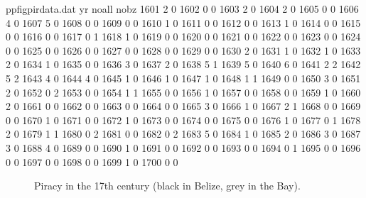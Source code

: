 \begin{filecontents}{ppfigpirdata.dat}
yr	noall	nobz
1601	2	0
1602	0	0
1603	2	0
1604	2	0
1605	0	0
1606	4	0
1607	5	0
1608	0	0
1609	0	0
1610	1	0
1611	0	0
1612	0	0
1613	1	0
1614	0	0
1615	0	0
1616	0	0
1617	0	1
1618	1	0
1619	0	0
1620	0	0
1621	0	0
1622	0	0
1623	0	0
1624	0	0
1625	0	0
1626	0	0
1627	0	0
1628	0	0
1629	0	0
1630	2	0
1631	1	0
1632	1	0
1633	2	0
1634	1	0
1635	0	0
1636	3	0
1637	2	0
1638	5	1
1639	5	0
1640	6	0
1641	2	2
1642	5	2
1643	4	0
1644	4	0
1645	1	0
1646	1	0
1647	1	0
1648	1	1
1649	0	0
1650	3	0
1651	2	0
1652	0	2
1653	0	0
1654	1	1
1655	0	0
1656	1	0
1657	0	0
1658	0	0
1659	1	0
1660	2	0
1661	0	0
1662	0	0
1663	0	0
1664	0	0
1665	3	0
1666	1	0
1667	2	1
1668	0	0
1669	0	0
1670	1	0
1671	0	0
1672	1	0
1673	0	0
1674	0	0
1675	0	0
1676	1	0
1677	0	1
1678	2	0
1679	1	1
1680	0	2
1681	0	0
1682	0	2
1683	5	0
1684	1	0
1685	2	0
1686	3	0
1687	3	0
1688	4	0
1689	0	0
1690	1	0
1691	0	0
1692	0	0
1693	0	0
1694	0	1
1695	0	0
1696	0	0
1697	0	0
1698	0	0
1699	1	0
1700	0	0
\end{filecontents}
\begin{figure}
\begin{sideways}
\end{sideways}
\caption{Piracy in the 17th century (black in Belize, grey in the Bay).}
\label{fig:piracyinbay}
\end{figure}
%
